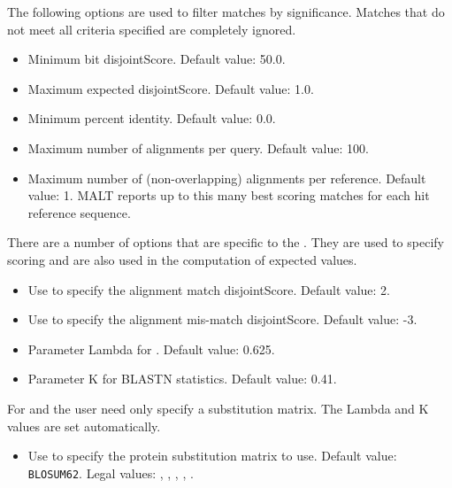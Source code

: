 \documentclass[11pt]{article}
\newcommand\MALT{{\sf MALT}\xspace}
\begin{document}
The following options are used to filter matches by significance. Matches that do not meet all criteria specified are completely ignored.
\begin{itemize}
\setlength{\itemindent}{30pt}
\item[\itt{--minBitScore}]          Minimum bit disjointScore. Default value: 50.0.
\item[\itt{--maxExpected}]           Maximum expected disjointScore. Default value: 1.0.
\item[{\itt{--minPercentIdentity}}]  Minimum percent identity. Default value: 0.0.
\item[{\itt{--maxAlignmentsPerQuery}}]  Maximum number of alignments per query. Default value: 100.
\item[{\itt{ --maxAlignmentsPerRef}}]   Maximum number of (non-overlapping) alignments  per reference. Default value: 1.
\MALT reports up to this many best scoring matches for each hit reference sequence.
\end{itemize}

{
There are a number of options that are specific to the . They are used to specify scoring and
are also used in the computation of expected values.
\begin{itemize}
\setlength{\itemindent}{30pt}
\item[\itt{--matchScore}]            Use to specify the alignment match disjointScore. Default value: 2.
\item[\itt{--mismatchScore}]        Use to specify the alignment mis-match disjointScore. Default value: -3.
\item[\itt{--setLambda}]           Parameter Lambda  for . Default value: 0.625.
\item[\itt{--setK}]                   Parameter K  for BLASTN statistics. Default value: 0.41.
\end{itemize}
}

For  and  the user need only specify a substitution matrix. The Lambda and
K values are set automatically.
\begin{itemize}
\setlength{\itemindent}{30pt}
\item[\itt{--subMatrix}] Use to specify the protein substitution matrix to use. Default value: {\tt BLOSUM62}. Legal values: 
, , , , .
\end{itemize}
\end{document}
